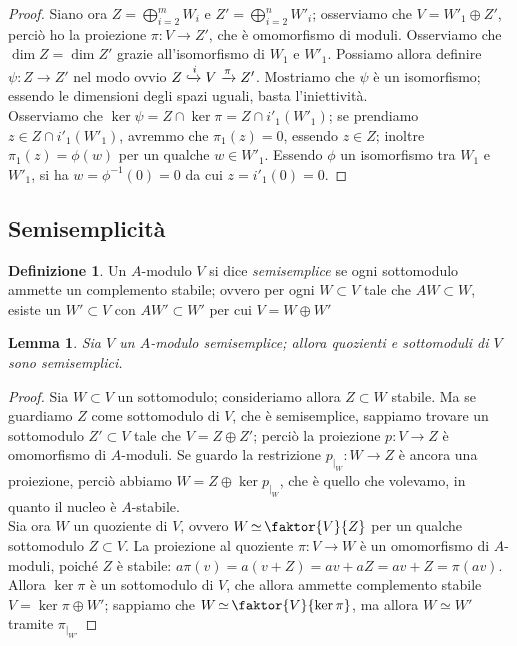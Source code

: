 \documentclass[11pt]{article}
\theoremstyle{plain}
\newtheorem{lemma}[thm]{Lemma}
\theoremstyle{definition}
\newtheorem{defn}{Definizione}[section]
\theoremstyle{remark}
\DeclareMathOperator{\iso}{\simeq}
\begin{document}
\begin{proof}
	 Siano ora $Z=\bigoplus_{i=2}^m W_i$ e $Z'=\bigoplus_{i=2}^n W'_i$; osserviamo che $V=W'_1\oplus Z'$, perciò ho la proiezione $\pi:V\to Z'$, che è omomorfismo di moduli. Osserviamo che $\dim Z=\dim Z'$ grazie all'isomorfismo di $W_1$ e $W'_1$.
	 Possiamo allora definire $\psi: Z\to Z'$ nel modo ovvio $Z\xhookrightarrow{i}V\xrightarrow{\pi}Z'$. Mostriamo che $\psi$ è un isomorfismo; essendo le dimensioni degli spazi uguali, basta l'iniettività.\\
	 Osserviamo che $\ker\psi=Z\cap\ker\pi=Z\cap i'_1(W'_1)$; se prendiamo $z\in Z\cap i'_1(W'_1)$, avremmo che $\pi_1(z)=0$, essendo $z\in Z$; inoltre $\pi_1(z)=\phi(w)$ per un qualche $w\in W'_1$. Essendo $\phi$ un isomorfismo tra $W_1$ e $W'_1$, si ha $w=\phi^{-1}(0)=0$ da cui $z=i'_1(0)=0$.
	\end{proof}

\subsection{Semisemplicità}
  \begin{defn}
   Un $A$-modulo $V$ si dice \emph{semisemplice} se ogni sottomodulo ammette un complemento stabile; ovvero per ogni $W\subset V$ tale che $AW\subset W$, esiste un $W'\subset V$ con $AW'\subset W'$ per cui $V=W\oplus W'$
  \end{defn}

  \begin{lemma}\label{quoz_smod_ss}
  	Sia $V$ un $A$-modulo semisemplice; allora quozienti e sottomoduli di $V$ sono semisemplici.
  \end{lemma}
  \begin{proof}
   Sia $W\subset V$ un sottomodulo; consideriamo allora $Z\subset W$ stabile. Ma se guardiamo $Z$ come sottomodulo di $V$, che è semisemplice, sappiamo trovare un sottomodulo $Z'\subset V$ tale che $V=Z\oplus Z'$; perciò la proiezione $p:V\to Z$ è omomorfismo di $A$-moduli. Se guardo la restrizione $p_{|_{W}}:W\to Z$ è ancora una proiezione, perciò abbiamo $W=Z\oplus\ker p_{|_{W}}$, che è quello che volevamo, in quanto il nucleo è $A$-stabile.\\
   Sia ora $W$ un quoziente di $V$, ovvero $W\iso\faktor{V}{Z}$ per un qualche sottomodulo $Z\subset V$. La proiezione al quoziente $\pi: V\to W$ è un omomorfismo di $A$-moduli, poiché $Z$ è stabile: $a\pi(v)=a(v+Z)=av+aZ=av+Z=\pi(av)$.\\
   Allora $\ker\pi$ è un sottomodulo di $V$, che allora ammette complemento stabile $V=\ker\pi\oplus W'$; sappiamo che $W\iso\faktor{V}{\ker\pi}$, ma allora $W\iso W'$ tramite $\pi_{|_{W'}}$
  \end{proof}
\end{document}
